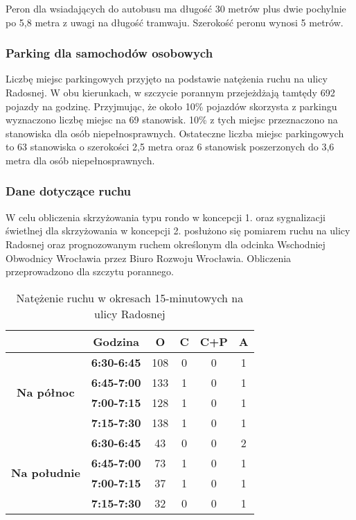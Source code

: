 \documentclass[twoside,12pt]{article}
\begin{document}
	Peron dla wsiadających do autobusu ma długość 30 metrów plus dwie pochylnie po 5,8 metra z uwagi na długość tramwaju. Szerokość peronu wynosi 5 metrów.
	
	\subsubsection{Parking dla samochodów osobowych}
	
	Liczbę miejsc parkingowych przyjęto na podstawie natężenia ruchu na ulicy Radosnej. W obu kierunkach, w szczycie porannym przejeżdżają tamtędy 692 pojazdy na godzinę. Przyjmując, że około 10\% pojazdów skorzysta z parkingu wyznaczono liczbę miejsc na 69 stanowisk. 10\% z tych miejsc przeznaczono na stanowiska dla osób niepełnosprawnych. Ostateczne liczba miejsc parkingowych to 63 stanowiska o szerokości 2,5 metra oraz 6 stanowisk poszerzonych do 3,6 metra dla osób niepełnosprawnych.
	
	\subsubsection{Dane dotyczące ruchu}
	
	W celu obliczenia skrzyżowania typu rondo w koncepcji 1. oraz sygnalizacji świetlnej dla skrzyżowania w koncepcji 2. posłużono się pomiarem ruchu na ulicy Radosnej oraz prognozowanym ruchem określonym dla odcinka Wschodniej Obwodnicy Wrocławia przez Biuro Rozwoju Wrocławia. Obliczenia przeprowadzono dla szczytu porannego. 
	
	\begin{table}[H]
		\centering
		\caption{Natężenie ruchu w okresach 15-minutowych na ulicy Radosnej}	
     \begin{tabular}{cccccc}
     \toprule
                & \textbf{Godzina} & \textbf{O} & \textbf{C} & \textbf{C+P} & \textbf{A} \bigstrut[b]\\
     \midrule
     \multirow{4}[2]{*}{\textbf{Na północ}} & \textbf{6:30-6:45} & 108        & 0          & 0          & 1 \bigstrut[t]\\
                & \textbf{6:45-7:00} & 133        & 1          & 0          & 1 \\
                & \textbf{7:00-7:15} & 128        & 1          & 0          & 1 \\
                & \textbf{7:15-7:30} & 138        & 1          & 0          & 1 \bigstrut[b]\\
     \midrule
     \multirow{4}[1]{*}{\textbf{Na południe}} & \textbf{6:30-6:45} & 43         & 0          & 0          & 2 \bigstrut[t]\\
                & \textbf{6:45-7:00} & 73         & 1          & 0          & 1 \\
                & \textbf{7:00-7:15} & 37         & 1          & 0          & 1 \\
                & \textbf{7:15-7:30} & 32         & 0          & 0          & 1 \\
                \bottomrule
     \end{tabular}%
     
     
	\end{table}
	
\end{document}
